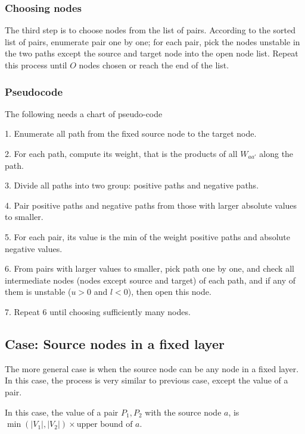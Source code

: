 \documentclass[8pt]{article}
\theoremstyle{definition}
\begin{document}
\subsubsection*{Choosing nodes}

The third step is to choose nodes from the list of pairs. According to the sorted list of pairs, enumerate pair one by one; for each pair, pick the nodes unstable in the two paths except the source and target node into the open node list. Repeat this process until $O$ nodes chosen or reach the end of the list.

\subsubsection*{Pseudocode}

The following needs a chart of pseudo-code

\vspace*{1ex}

1. Enumerate all path from the fixed source node to the target node. 

2. For each path, compute its weight, that is the products of all $W_{aa'}$ along the path.

3. Divide all paths into two group: positive paths and negative paths.

4. Pair positive paths and negative paths from those with larger absolute values to smaller. 

5. For each pair, its value is the min of the weight positive paths and absolute negative values.

6. From pairs with larger values to smaller, pick path one by one, and check all intermediate nodes (nodes except source and target) of each path, and if any of them is unstable ($u>0$ and $l<0$), then open this node. 

7. Repeat 6 until choosing sufficiently many nodes.






\subsection*{Case: Source nodes in a fixed layer}

The more general case is when the source node can be any node in a fixed layer. In this case, the process is very similar to previous case, except the value of a pair.

In this case, the value of a pair $P_1,P_2$ with the source node $a$, is $\min(|V_1|,|V_2|)\times \text{upper bound of } a$.
\end{document}
